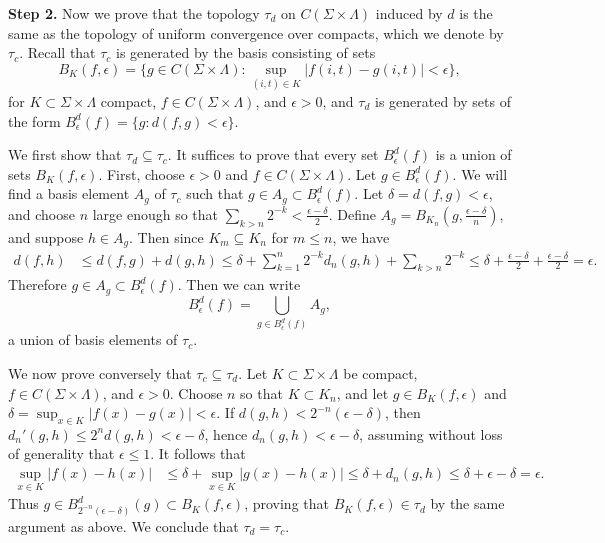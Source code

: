 \noindent\textbf{Step 2.} Now we prove that the topology $\tau_d$ on $C(\Sigma\times\Lambda)$ induced by $d$ is the same as the topology of uniform convergence over compacts, which we denote by $\tau_c$. Recall that $\tau_c$ is generated by the basis consisting of sets
\[
B_K(f,\epsilon) = \Big\{g\in C(\Sigma\times\Lambda) : \sup_{(i,t)\in K} |f(i,t) - g(i,t)| < \epsilon \Big\},
\]
for $K\subset\Sigma\times\Lambda$ compact, $f\in C(\Sigma\times\Lambda)$, and $\epsilon>0$, and $\tau_d$ is generated by sets of the form $B^d_\epsilon(f) = \{g:d(f,g) < \epsilon\}$. 

We first show that $\tau_d \subseteq \tau_c$. It suffices to prove that every set $B_\epsilon^d(f)$ is a union of sets $B_K(f,\epsilon)$. First, choose $\epsilon>0$ and $f\in C(\Sigma\times\Lambda)$. Let $g\in B^d_\epsilon(f)$. We will find a basis element $A_g$ of $\tau_c$ such that $g\in A_g\subset B^d_\epsilon(f)$. Let $\delta = d(f,g) < \epsilon$, and choose $n$ large enough so that $\sum_{k>n} 2^{-k} < \frac{\epsilon-\delta}{2}$. Define $A_g = B_{K_n}(g,\frac{\epsilon-\delta}{n})$, and suppose $h\in A_g$. Then since $K_m\subseteq K_n$ for $m\leq n$, we have
\begin{align*}
d(f,h) &\leq d(f,g) + d(g,h) \leq \delta + \sum_{k=1}^n 2^{-k}d_n(g,h) + \sum_{k>n} 2^{-k} \leq \delta + \frac{\epsilon-\delta}{2} + \frac{\epsilon-\delta}{2} = \epsilon.
\end{align*}
Therefore $g\in A_g\subset B^d_\epsilon(f)$. Then we can write
\[
B^d_\epsilon(f) = \bigcup_{g\in B^d_\epsilon(f)} A_g,
\]
a union of basis elements of $\tau_c$.

We now prove conversely that $\tau_c\subseteq\tau_d$. Let $K\subset\Sigma\times\Lambda$ be compact, $f\in C(\Sigma\times\Lambda)$, and $\epsilon>0$. Choose $n$ so that $K\subset K_n$, and let $g\in B_K(f,\epsilon)$ and $\delta = \sup_{x\in K} |f(x)-g(x)| < \epsilon$. If $d(g,h) < 2^{-n}(\epsilon-\delta)$, then $d_n'(g,h) \leq 2^n d(g,h) < \epsilon-\delta$, hence $d_n(g,h) < \epsilon-\delta$, assuming without loss of generality that $\epsilon \leq 1$. It follows that
\begin{align*}
\sup_{x\in K} |f(x)-h(x)| &\leq \delta + \sup_{x\in K} |g(x)-h(x)| \leq \delta + d_n(g,h) \leq \delta + \epsilon-\delta = \epsilon.
\end{align*}
Thus $g\in B^d_{2^{-n}(\epsilon-\delta)}(g) \subset B_K(f,\epsilon)$, proving that $B_K(f,\epsilon)\in\tau_d$ by the same argument as above. We conclude that $\tau_d = \tau_c$.\\

